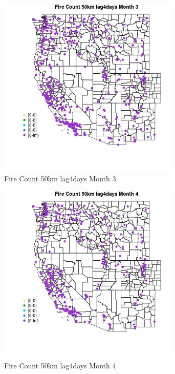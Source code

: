 \begin{figure} 
\centering  
\includegraphics[width=0.77\textwidth]{Code_Outputs/Report_ML_input_PM25_Step4_part_e_de_duplicated_aves_compiled_2019-05-18wNAs_MapObsMo3Fire_Count_50km_lag4days.jpg} 
\caption{\label{fig:Report_ML_input_PM25_Step4_part_e_de_duplicated_aves_compiled_2019-05-18wNAsMapObsMo3Fire_Count_50km_lag4days}Fire Count 50km lag4days Month 3} 
\end{figure} 
 

\begin{figure} 
\centering  
\includegraphics[width=0.77\textwidth]{Code_Outputs/Report_ML_input_PM25_Step4_part_e_de_duplicated_aves_compiled_2019-05-18wNAs_MapObsMo4Fire_Count_50km_lag4days.jpg} 
\caption{\label{fig:Report_ML_input_PM25_Step4_part_e_de_duplicated_aves_compiled_2019-05-18wNAsMapObsMo4Fire_Count_50km_lag4days}Fire Count 50km lag4days Month 4} 
\end{figure} 
 

